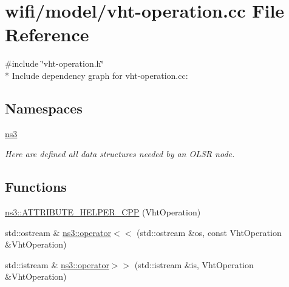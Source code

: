 \hypertarget{vht-operation_8cc}{}\section{wifi/model/vht-\/operation.cc File Reference}
\label{vht-operation_8cc}
{\ttfamily \#include \char`\"{}vht-\/operation.\+h\char`\"{}}\\*
Include dependency graph for vht-\/operation.cc\+:
\subsection*{Namespaces}
\begin{DoxyCompactItemize}
\item 
 \hyperlink{namespacens3}{ns3}
\begin{DoxyCompactList}\small\item\em Here are defined all data structures needed by an O\+L\+SR node. \end{DoxyCompactList}\end{DoxyCompactItemize}
\subsection*{Functions}
\begin{DoxyCompactItemize}
\item 
\hyperlink{namespacens3_a50c19bfd31dc4e45745a805389217257}{ns3\+::\+A\+T\+T\+R\+I\+B\+U\+T\+E\+\_\+\+H\+E\+L\+P\+E\+R\+\_\+\+C\+PP} (Vht\+Operation)
\item 
std\+::ostream \& \hyperlink{namespacens3_a130046800fb142349fb2315adcb8fbef}{ns3\+::operator$<$$<$} (std\+::ostream \&os, const Vht\+Operation \&Vht\+Operation)
\item 
std\+::istream \& \hyperlink{namespacens3_a1d29944d7197360f05e4265bfc8069fa}{ns3\+::operator$>$$>$} (std\+::istream \&is, Vht\+Operation \&Vht\+Operation)
\end{DoxyCompactItemize}
